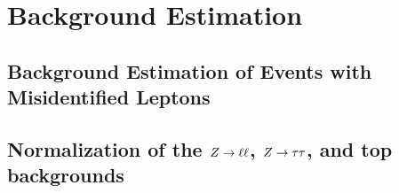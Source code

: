 \chapter{Background Estimation}\label{cha:background_estimation}

\section{Background Estimation of Events with Misidentified Leptons}\label{sec:background_estimation:fakes}

\section{Normalization of the $Z \to \ell \ell$, $Z \to \tau \tau$, and top backgrounds}\label{sec:background_estimation:normalization}
